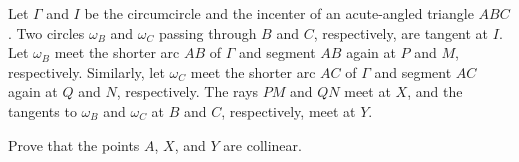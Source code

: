 Let $\Gamma$ and $I$ be the circumcircle and the incenter of an acute-angled triangle $ABC$. Two circles $\omega_B$ and $\omega_C$ passing through $B$ and $C$, respectively, are tangent at $I$. Let $\omega_B$ meet the shorter arc $AB$ of $\Gamma$ and segment $AB$ again at $P$ and $M$, respectively. Similarly, let $\omega_C$ meet the shorter arc $AC$ of $\Gamma$ and segment $AC$ again at $Q$ and $N$, respectively. The rays $PM$ and $QN$ meet at $X$, and the tangents to $\omega_B$ and $\omega_C$ at $B$ and $C$, respectively, meet at $Y$.

Prove that the points $A$, $X$, and $Y$ are collinear.
